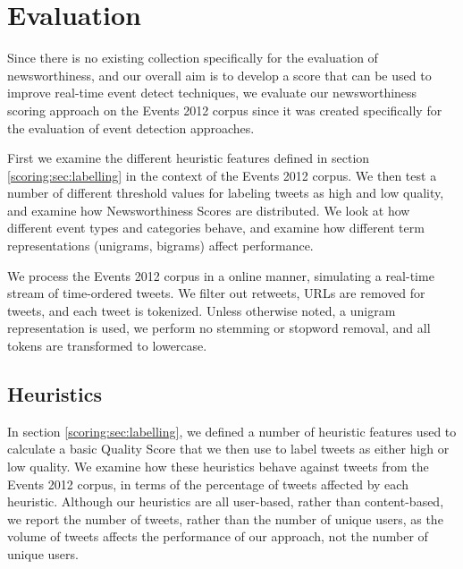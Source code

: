 
\section{Evaluation}
\label{scoring:sec:eval}

Since there is no existing collection specifically for the evaluation of newsworthiness, and our overall aim is to develop a score that can be used to improve real-time event detect techniques, we evaluate our newsworthiness scoring approach on the Events 2012 corpus since it was created specifically for the evaluation of event detection approaches.

First we examine the different heuristic features defined in section \ref{scoring:sec:labelling} in the context of the Events 2012 corpus.
We then test a number of different threshold values for labeling tweets as high and low quality, and examine how Newsworthiness Scores are distributed.
We look at how different event types and categories behave, and examine how different term representations (unigrams, bigrams)  affect performance.

We process the Events 2012 corpus in a online manner, simulating a real-time stream of time-ordered tweets.
We filter out retweets, URLs are removed for tweets, and each tweet is tokenized. Unless otherwise noted, a unigram representation is used, we perform no stemming or stopword removal, and all tokens are transformed to lowercase.

\subsection{Heuristics}
In section \ref{scoring:sec:labelling}, we defined a number of heuristic features used to calculate a basic Quality Score that we then use to label tweets as either high or low quality.
We examine how these heuristics behave against tweets from the Events 2012 corpus, in terms of the percentage of tweets affected by each heuristic.
Although our heuristics are all user-based, rather than content-based, we report the number of tweets, rather than the number of unique users, as the volume of tweets affects the performance of our approach, not the number of unique users.

